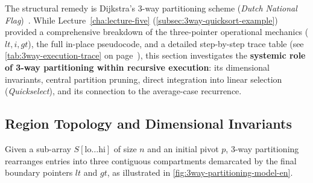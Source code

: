 The structural remedy is Dijkstra's 3-way partitioning scheme (\textit{Dutch National Flag})~\cite{dijkstra1976}. While Lecture~\ref{cha:lecture-five} (\autoref{subsec:3way-quicksort-example}) provided a comprehensive breakdown of the three-pointer operational mechanics ($lt, i, gt$), the full in-place pseudocode, and a detailed step-by-step trace table (see \autoref{tab:3way-execution-trace} on page~\pageref{tab:3way-execution-trace}), this section investigates the \textbf{systemic role of 3-way partitioning within recursive execution}: its dimensional invariants, central partition pruning, direct integration into linear selection (\textit{Quickselect}), and its connection to the average-case recurrence.

\subsection{Region Topology and Dimensional Invariants}
\label{subsec:3way-invariants-dimensional}

Given a sub-array $S[\text{lo} \dots \text{hi}]$ of size $n$ and an initial pivot $p$, 3-way partitioning rearranges entries into three contiguous compartments demarcated by the final boundary pointers $lt$ and $gt$, as illustrated in \autoref{fig:3way-partitioning-model-en}.

